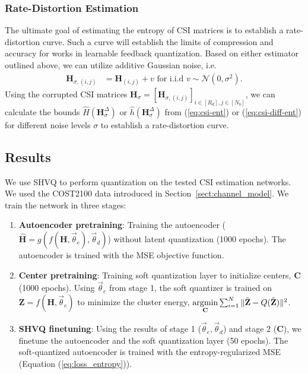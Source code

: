 \subsubsection{Rate-Distortion Estimation} \label{sec:rd_quant}

The ultimate goal of estimating the entropy of CSI matrices is to establish a rate-distortion curve. Such a curve will establish the limits of compression and accuracy for works in learnable feedback quantization. Based on either estimator outlined above, we can utilize additive Gaussian noise, i.e.
\begin{align*}
	\mathbf H_{\sigma,(i,j)} &= \mathbf H_{(i,j)} + v \text{ for i.i.d } v \sim \mathcal{N}(0,\sigma^2).
\end{align*}
Using the corrupted CSI matrices $\mathbf H_{\sigma}=\left[\mathbf H_{\sigma,(i,j)}\right]_{i\in [R_d],j\in [N_b]}$, we can calculate the bounds $\hat H(\mathbf H_{\sigma}^\Delta)$ or $\hat h(\mathbf H_{\sigma}^\Delta)$ from (\ref{eq:csi-ent}) or (\ref{eq:csi-diff-ent}) for different noise levels $\sigma$ to establish a rate-distortion curve.

\subsection{Results}

We use SHVQ \cite{ref:Agustsson2017SoftToHard} to perform quantization on the tested CSI estimation networks. We used the COST2100 data introduced in Section~\ref{sect:channel_model}. We train the network in three stages:
\begin{enumerate}
	\item \textbf{Autoencoder pretraining}: Training the autoencoder ($\hat{\mathbf{H}}=g(f(\mathbf H, \vec\theta_e), \vec\theta_d)$) without latent quantization (1000 epochs). The autoencoder is trained with the MSE objective function.
	\item \textbf{Center pretraining}: Training soft quantization layer to initialize centers, $\mathbf C$ (1000 epochs). Using $\vec \theta_e$ from stage 1, the soft quantizer is trained on $\mathbf Z=f(\mathbf H, \vec \theta_e)$ to minimize the cluster energy, $\underset{\mathbf C}{\text{argmin}}\sum_{i=1}^N \Arrowvert \tilde{\mathbf Z} - Q(\tilde{\mathbf Z})\Arrowvert^2$.
	\item \textbf{SHVQ finetuning}: Using the results of stage 1 ($\vec\theta_e, \vec\theta_d$) and stage 2 ($\mathbf C$), we finetune the autoencoder and the soft quantization layer (50 epochs). The soft-quantized autoencoder is trained with the entropy-regularized MSE (Equation (\ref{eq:loss_entropy})).
\end{enumerate}

